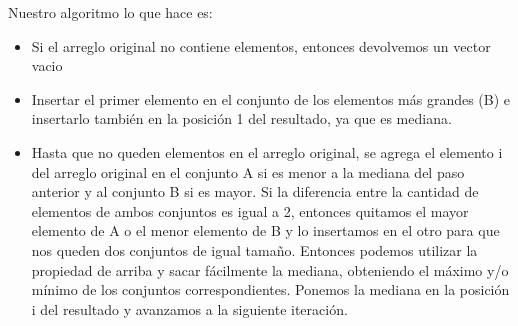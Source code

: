 Nuestro algoritmo lo que hace es: 
\begin{itemize}
\item Si el arreglo original no contiene elementos, entonces devolvemos un vector vacio
\item Insertar el primer elemento en el conjunto de los elementos más grandes (B) e insertarlo también en la posición 1 del resultado, ya que es mediana.
\item Hasta que no queden elementos en el arreglo original, se agrega el elemento i del arreglo original en el conjunto A si es menor a la mediana del paso anterior y al conjunto B si es mayor. Si la diferencia entre la cantidad de elementos de ambos conjuntos es igual a 2, entonces quitamos el mayor elemento de A o el menor elemento de B y lo insertamos en el otro para que nos queden dos conjuntos de igual tamaño. Entonces podemos utilizar la propiedad de arriba y sacar fácilmente la mediana, obteniendo el máximo y/o mínimo de los conjuntos correspondientes. Ponemos la mediana en la posición i del resultado y avanzamos a la siguiente iteración.
\end{itemize}

